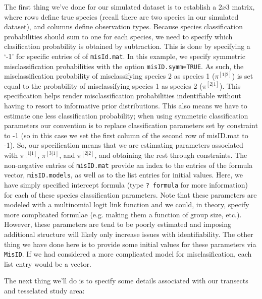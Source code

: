 \documentclass{article}\usepackage{graphicx, color}
\begin{document}
The first thing we've done for our simulated dataset is to establish a $2x3$ matrix, where rows define true species (recall there are two species in our simulated dataset), and columns define observation types.  Because species classification probabilities should sum to one for each species, we need to
specify which clasification probability is obtained by subtraction.  This is done by
specifying a `-1' for specific entries of of \texttt{misId.mat}.  In this example, we specify symmetric misclassification probabilities with the option \texttt{misID.symm=TRUE}.  As such, the misclassification probability of misclassifying species 2 as species 1 ($\pi^{[1|2]}$) is set equal to the probability of misclassifying species 1 as species 2 ($\pi^{[2|1]}$).  This specification helps render misclassification probabilities indentifiable \citep{ConnEtAl2013} without having to resort to informative prior distributions.  This also means we have to estimate one less classification probability; when using symmetric classification parameters our convention is to replace classification parameters set by constraint to -1 (so in this case we set the first column of the second row of misID.mat to -1).  So, our specification means that we are estimating parameters associated with $\pi^{[1|1]}$, $\pi^{[3|1]}$, and $\pi^{[2|2]}$, and obtaining the rest through constraints.  The non-negative entries of \texttt{misID.mat} provide an index to the entries of the formula vector, \texttt{misID.models}, as well as to the list entries for initial values.  Here, we have simply specified intercept formula (type \texttt{? formula} for more information) for each of these species classification parameters.  Note that these parameters are modeled with a multinomial logit link function and we could, in theory, specify more complicated formulae (e.g. making them a function of group size, etc.).  However, these parameters are tend to be poorly estimated and imposing additional structure will likely only increase issues with identifiability.
The other thing we have done here is to provide some initial values for these parameters via \texttt{MisID}.  If we had considered a more complicated model for misclasification, each list entry would be a vector.

The next thing we'll do is to specify some details associated with our transects
and tesselated study area:  
\end{document}
